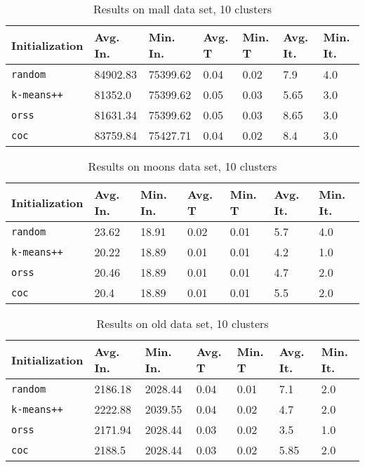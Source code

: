 \documentclass[twoside, 11pt]{article}
\begin{document}
		\begin{table}[p]
			\begin{center}
				\begin{tabular}{|l|l|l|l|l|l|l|}
					\hline
					Initialization & Avg. In. & Min. In. & Avg. T & Min. T & Avg. It. & Min. It.\\\hline
					\texttt{random} & 84902.83 & 75399.62 & 0.04 & 0.02 & 7.9 & 4.0\\\hline
					\texttt{k-means++} & 81352.0 & 75399.62 & 0.05 & 0.03 & 5.65 & 3.0\\\hline
					\texttt{orss} & 81631.34 & 75399.62 & 0.05 & 0.03 & 8.65 & 3.0\\\hline
					\texttt{coc} & 83759.84 & 75427.71 & 0.04 & 0.02 & 8.4 & 3.0\\\hline
				\end{tabular}
				\caption{Results on mall data set, 10 clusters}
				\label{tbl:mall10}
			\end{center}
		\end{table}
		
		\begin{table}[p]
			\begin{center}
				\begin{tabular}{|l|l|l|l|l|l|l|}
					\hline
					Initialization & Avg. In. & Min. In. & Avg. T & Min. T & Avg. It. & Min. It.\\\hline
					\texttt{random} & 23.62 & 18.91 & 0.02 & 0.01 & 5.7 & 4.0\\\hline
					\texttt{k-means++} & 20.22 & 18.89 & 0.01 & 0.01 & 4.2 & 1.0\\\hline
					\texttt{orss} & 20.46 & 18.89 & 0.01 & 0.01 & 4.7 & 2.0\\\hline
					\texttt{coc} & 20.4 & 18.89 & 0.01 & 0.01 & 5.5 & 2.0\\\hline
				\end{tabular}
				\caption{Results on moons data set, 10 clusters}
				\label{tbl:moons10}
			\end{center}
		\end{table}
		
		\begin{table}[p]
			\begin{center}
				\begin{tabular}{|l|l|l|l|l|l|l|}
					\hline
					Initialization & Avg. In. & Min. In. & Avg. T & Min. T & Avg. It. & Min. It.\\\hline
					\texttt{random} & 2186.18 & 2028.44 & 0.04 & 0.01 & 7.1 & 2.0\\\hline
					\texttt{k-means++} & 2222.88 & 2039.55 & 0.04 & 0.02 & 4.7 & 2.0\\\hline
					\texttt{orss} & 2171.94 & 2028.44 & 0.03 & 0.02 & 3.5 & 1.0\\\hline
					\texttt{coc} & 2188.5 & 2028.44 & 0.03 & 0.02 & 5.85 & 2.0\\\hline
				\end{tabular}
				\caption{Results on old data set, 10 clusters}
				\label{tbl:old10}
			\end{center}
		\end{table}
		
\end{document}
